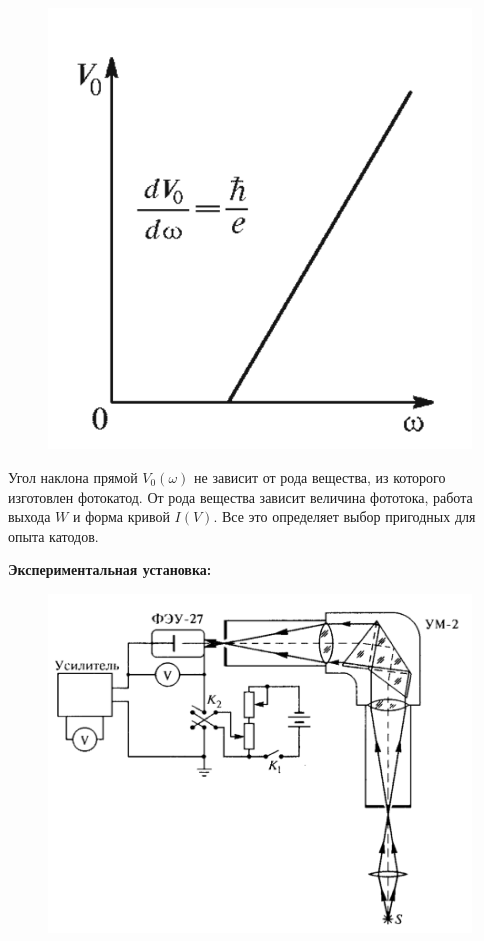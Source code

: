 \documentclass[a4paper, 12pt]{article}%
\begin{document}
	\begin{figure}[h!]
	    \centering
		\includegraphics[scale=0.3]{График_2.PNG}
	\end{figure}
	
	Угол наклона прямой $V_0(\omega)$ не зависит от рода вещества,  из которого изготовлен фотокатод.  От рода вещества зависит величина фототока,  работа выхода $W$ и форма кривой $I(V)$.  Все это определяет выбор пригодных для опыта катодов.\\

\newpage
	
\textbf{Экспериментальная установка:}\\\par

	\begin{figure}[h!]
	    \centering
		\includegraphics[scale=0.7]{Схема.PNG}
	\end{figure}
\end{document}
